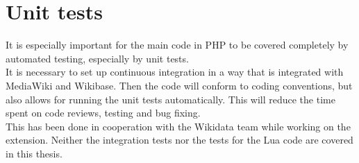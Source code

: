 \section {Unit tests}
It is especially important for the main code in PHP to be covered completely by automated testing, especially by unit tests. \\
It is necessary to set up continuous integration in a way that is integrated with MediaWiki and Wikibase. Then the code will conform to coding conventions, but also allows for running the unit tests automatically. This will reduce the time spent on code reviews, testing and bug fixing. \\
This has been done in cooperation with the Wikidata team while working on the extension. Neither the integration tests nor the tests for the Lua code are covered in this thesis. \\ 